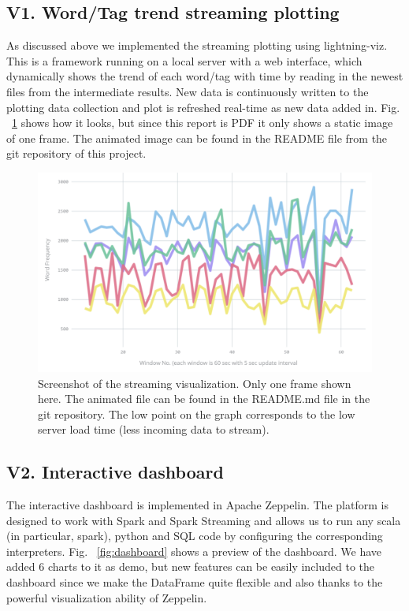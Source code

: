 \documentclass[manuscript, review, screen]{acmart}
\begin{document}
\subsection{V1. Word/Tag trend streaming plotting}
As discussed above we implemented the streaming plotting using lightning-viz. This is a framework running on a local server with a web interface, which dynamically shows the trend of each word/tag with time by reading in the newest files from the intermediate results. New data is continuously written to the plotting data collection and plot is refreshed real-time as new data added in. Fig. ~\ref{fig:streaming-vis} shows how it looks, but since this report is PDF it only shows a static image of one frame. The animated image can be found in the README file from the git repository of this project.

\begin{figure}
    \centering
    \includegraphics[width=5in]{streamingplot.png}
    \caption{Screenshot of the streaming visualization. Only one frame shown here. The animated file can be found in the README.md file in the git repository. The low point on the graph corresponds to the low server load time (less incoming data to stream).}
    \label{fig:streaming-vis}
\end{figure}

\subsection{V2. Interactive dashboard}
The interactive dashboard is implemented in Apache Zeppelin. The platform is designed to work with Spark and Spark Streaming and allows us to run any scala (in particular, spark), python and SQL code by configuring the corresponding interpreters. Fig. ~\ref{fig:dashboard} shows a preview of the dashboard. We have added 6 charts to it as demo, but new features can be easily included to the dashboard since we make the DataFrame quite flexible and also thanks to the powerful visualization ability of Zeppelin.
\end{document}
